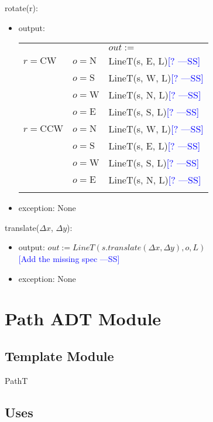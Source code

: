 \documentclass[12pt]{article}
\newcommand{\authornote}[3]{\textcolor{#1}{[#3 ---#2]}}
\newcommand{\authornote}[3]{}
\newcommand{\wss}[1]{\authornote{blue}{SS}{#1}}
\begin{document}
\noindent rotate(r):
\begin{itemize}
\item output: 
\begin{tabular}{|p{}|p{2.3cm}|l|}
\hhline{~|~|-|}
\multicolumn{1}{r}{} & \multicolumn{1}{r|}{} & \multicolumn{1}{l|}{$out :=$}\\
\hhline{|-|-|-|}
$r = \mbox{CW}$ & $o = \mbox{N}$ & LineT(s, E, L)\wss{?}\\
\hhline{|~|-|-|}
~ & $o = \mbox{S}$ & LineT(s, W, L)\wss{?}\\
\hhline{|~|-|-|}
~ & $o = \mbox{W}$ & LineT(s, N, L)\wss{?}\\
\hhline{|~|-|-|}
~ & $o = \mbox{E}$ & LineT(s, S, L)\wss{?}\\
\hhline{-|-|-|}
$r = \mbox{CCW}$ & $o = \mbox{N}$ & LineT(s, W, L)\wss{?}\\
\hhline{|~|-|-|}
~ & $o = \mbox{S}$ & LineT(s, E, L)\wss{?}\\
\hhline{|~|-|-|}
~ & $o = \mbox{W}$ & LineT(s, S, L)\wss{?}\\
\hhline{|~|-|-|}
~ & $o = \mbox{E}$ & LineT(s, N, L)\wss{?}\\
\hhline{-|-|-|}
\end{tabular}

\item exception: None
\end{itemize}

\noindent translate($\Delta x$, $\Delta y$):
\begin{itemize}
\item output: $out := LineT(s.translate(\Delta x, \Delta y), o, L)$\\
\wss{Add the missing spec}
\item exception: None
\end{itemize}

\newpage

\section* {Path ADT Module}

\subsection*{Template Module}

PathT

\subsection* {Uses}
\end{document}
